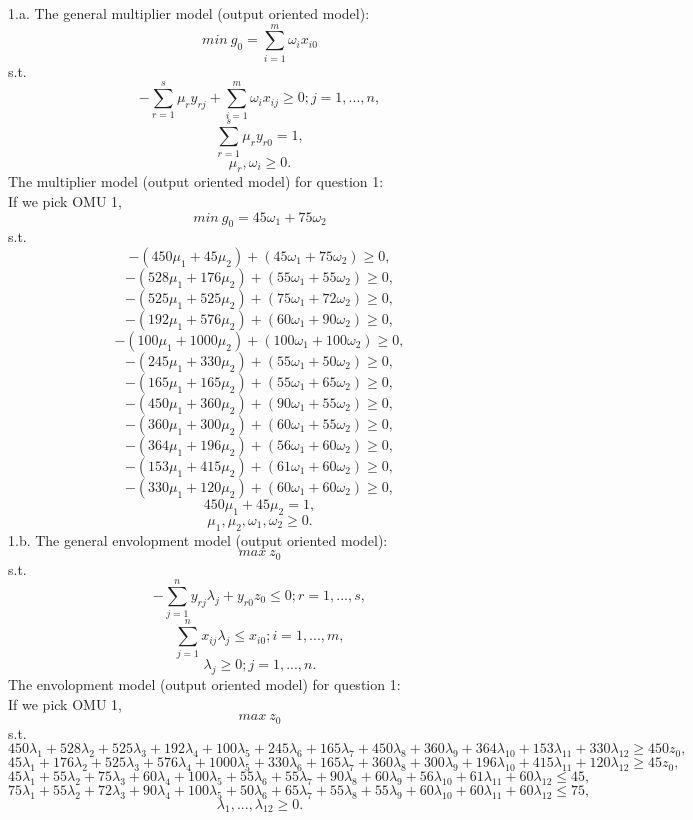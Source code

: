 \documentclass{article}
\begin{document}
1.a. The general multiplier model (output oriented model):
$$ min\ g_0 = \sum_{i=1}^m \omega_i x_{i0} $$
s.t.
$$ - \sum_{r=1}^s \mu_r y_{rj} + \sum_{i=1}^m \omega_i x_{ij} \geq 0; j = 1, ..., n, $$
$$ \sum_{r=1}^s \mu_r y_{r0} = 1, $$
$$ \mu_r, \omega_i \geq 0. $$
The multiplier model (output oriented model) for question 1: \\
If we pick OMU 1,
$$ min\ g_0 = 45 \omega_1 + 75 \omega_2 $$
s.t.
$$ - (450 \mu_1 + 45 \mu_2) + (45 \omega_1 + 75 \omega_2) \geq 0, $$
$$ - (528 \mu_1 + 176 \mu_2) + (55 \omega_1 + 55 \omega_2) \geq 0, $$
$$ - (525 \mu_1 + 525 \mu_2) + (75 \omega_1 + 72 \omega_2) \geq 0, $$
$$ - (192 \mu_1 + 576 \mu_2) + (60 \omega_1 + 90 \omega_2) \geq 0, $$
$$ - (100 \mu_1 + 1000 \mu_2) + (100 \omega_1 + 100 \omega_2) \geq 0, $$
$$ - (245 \mu_1 + 330 \mu_2) + (55 \omega_1 + 50 \omega_2) \geq 0, $$
$$ - (165 \mu_1 + 165 \mu_2) + (55 \omega_1 + 65 \omega_2) \geq 0, $$
$$ - (450 \mu_1 + 360 \mu_2) + (90 \omega_1 + 55 \omega_2) \geq 0, $$
$$ - (360 \mu_1 + 300 \mu_2) + (60 \omega_1 + 55 \omega_2) \geq 0, $$
$$ - (364 \mu_1 + 196 \mu_2) + (56 \omega_1 + 60 \omega_2) \geq 0, $$
$$ - (153 \mu_1 + 415 \mu_2) + (61 \omega_1 + 60 \omega_2) \geq 0, $$
$$ - (330 \mu_1 + 120 \mu_2) + (60 \omega_1 + 60 \omega_2) \geq 0, $$
$$ 450 \mu_1 + 45 \mu_2 = 1, $$
$$ \mu_1, \mu_2, \omega_1, \omega_2 \geq 0. $$
\newpage
1.b. The general envolopment model (output oriented model):
$$ max\ z_0 $$
s.t.
$$ - \sum_{j = 1}^n y_{rj} \lambda_j + y_{r0} z_0 \leq 0; r = 1, ..., s, $$
$$ \sum_{j=1}^n x_{ij} \lambda_j \leq x_{i0}; i = 1, ..., m, $$
$$ \lambda_j \geq 0; j = 1, ..., n. $$
The envolopment model (output oriented model) for question 1: \\
If we pick OMU 1,
$$ max\ z_0 $$
s.t.
$$ 450 \lambda_1 + 528 \lambda_2 + 525 \lambda_3 + 192 \lambda_4 + 100 \lambda_5 + 245 \lambda_6 + 165 \lambda_7 + 450 \lambda_8 + 360 \lambda_9 + 364 \lambda_{10} + 153 \lambda_{11} + 330 \lambda_{12} \geq 450 z_0, $$
$$ 45 \lambda_1 + 176 \lambda_2 + 525 \lambda_3 + 576 \lambda_4 + 1000 \lambda_5 + 330 \lambda_6 + 165 \lambda_7 + 360 \lambda_8 + 300 \lambda_9 + 196 \lambda_{10} + 415 \lambda_{11} + 120 \lambda_{12} \geq 45 z_0, $$
$$ 45 \lambda_1 + 55 \lambda_2 + 75 \lambda_3 + 60 \lambda_4 + 100 \lambda_5 + 55 \lambda_6 + 55 \lambda_7 + 90 \lambda_8 + 60 \lambda_9 + 56 \lambda_{10} + 61 \lambda_{11} + 60 \lambda_{12} \leq 45, $$
$$ 75 \lambda_1 + 55 \lambda_2 + 72 \lambda_3 + 90 \lambda_4 + 100 \lambda_5 + 50 \lambda_6 + 65 \lambda_7 + 55 \lambda_8 + 55 \lambda_9 + 60 \lambda_{10} + 60 \lambda_{11} + 60 \lambda_{12} \leq 75, $$
$$ \lambda_1, ..., \lambda_{12} \geq 0. $$
\end{document}
